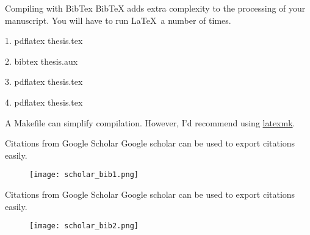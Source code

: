 \begin{frame}{Compiling with BibTex}
  BibTeX adds extra complexity to the processing of your manuscript. You will
  have to run \LaTeX\ a number of times.

  \alert{1.} pdflatex thesis.tex

  \alert{2.} bibtex thesis.\alert{aux}

  \alert{3.} pdflatex thesis.tex

  \alert{4.} pdflatex thesis.tex

  A Makefile can simplify compilation. However, I'd recommend using
  \href{https://ctan.org/pkg/latexmk?lang=en}{latexmk}.
\end{frame}

\begin{frame}{Citations from Google Scholar}
  Google scholar can be used to export citations easily.
  \begin{figure}
    \centering
    \texttt{[image: scholar\_bib1.png]}
  \end{figure}
\end{frame}

\begin{frame}{Citations from Google Scholar}
Google scholar can be used to export citations easily.
  \begin{figure}
    \centering
    \texttt{[image: scholar\_bib2.png]}
  \end{figure}
\end{frame}

